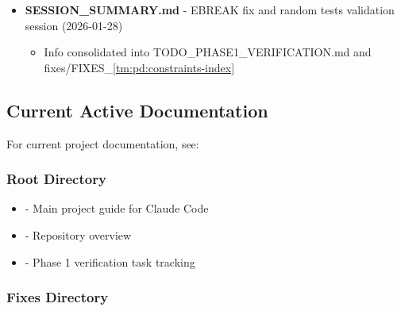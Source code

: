 \begin{record}

\begin{itemize}
\tightlist
\item
  \textbf{SESSION\_\allowbreak{}SUMMARY.md} - EBREAK fix and random
  tests validation session (2026-01-28)

  \begin{itemize}
  \tightlist
  \item
    Info consolidated into
    TODO\_\allowbreak{}PHASE1\_\allowbreak{}VERIFICATION.md and
    fixes/\allowbreak{}FIXES\_\allowbreak{}\cref{tm:pd:constraints-index}
  \end{itemize}
\end{itemize}

\end{record}

\subsection{Current Active Documentation}\label{cr:app:archive-readme:current-active-documentation}

\begin{record}

For current project documentation, see:

\end{record}

\subsubsection{Root Directory}\label{cr:app:archive-readme:root-directory}

\begin{record}

\begin{itemize}
\tightlist
\item
   - Main project guide for Claude Code
\item
   - Repository overview
\item
   - Phase 1 verification task
  tracking
\end{itemize}

\end{record}

\subsubsection{Fixes Directory}\label{cr:app:archive-readme:fixes-directory}

